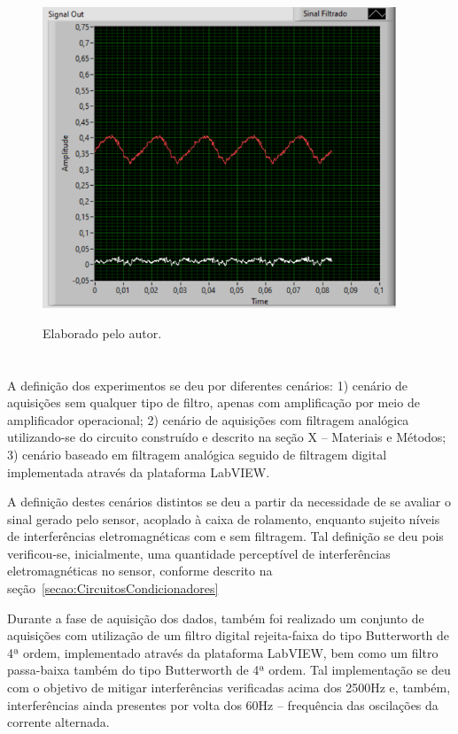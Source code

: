 \documentclass[
	12pt,				
	oneside,			
	a4paper,			
	english,			
	brazil,			
	]{abntex2ppgsi}
\begin{document}
\begin{figure}[H]
\centering
\caption {Elaborado pelo autor.}
\includegraphics[width=\textwidth,height=90mm,keepaspectratio]{GraficosAnalise/sinal_filtrado_maquina_desligada}
\label{sinal_filtrado_maquina_desligada}
\end{figure} 



\section{}

A definição dos experimentos se deu por diferentes cenários: 1) cenário de aquisições sem qualquer tipo de filtro, apenas com amplificação por meio de amplificador operacional; 2) cenário de aquisições com filtragem analógica utilizando-se do circuito construído e descrito na seção X – Materiais e Métodos; 3) cenário baseado em filtragem analógica seguido de filtragem digital implementada através da plataforma LabVIEW.

A definição destes cenários distintos se deu a partir da necessidade de se avaliar o sinal gerado pelo sensor, acoplado à caixa de rolamento, enquanto sujeito níveis de interferências eletromagnéticas com e sem filtragem. Tal definição se deu pois verificou-se, inicialmente, uma quantidade perceptível de interferências eletromagnéticas no sensor, conforme descrito na seção~\ref{secao:CircuitosCondicionadores}

Durante a fase de aquisição dos dados, também foi realizado um conjunto de aquisições com utilização de um filtro digital rejeita-faixa do tipo Butterworth de 4ª ordem, implementado através da plataforma LabVIEW, bem como um filtro passa-baixa também do tipo Butterworth de 4ª ordem. Tal implementação se deu com o objetivo de mitigar interferências verificadas acima dos 2500Hz e, também, interferências ainda presentes por volta dos 60Hz – frequência das oscilações da corrente alternada. 
\end{document}

